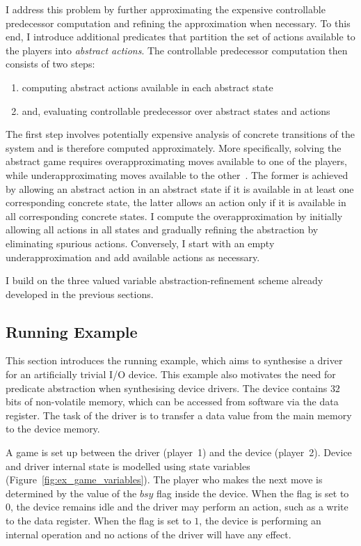 I address this problem by further approximating the expensive controllable predecessor computation and refining the approximation when necessary. To this end, I introduce additional predicates that partition the set of actions available to the players into \emph{abstract actions}. The controllable predecessor computation then consists of two steps: 

\begin{enumerate}
    \item computing abstract actions available in each abstract state
    \item and, evaluating controllable predecessor over abstract states and actions
\end{enumerate}

The first step involves potentially expensive analysis of concrete transitions of the system and is therefore computed approximately. More specifically, solving the abstract game requires overapproximating moves available to one of the players, while underapproximating moves available to the other~\cite{Henzinger_JM_03}.  The former is achieved by allowing an abstract action in an abstract state if it is available in at least one corresponding concrete state, the latter allows an action only if it is available in all corresponding concrete states. I compute the overapproximation by initially allowing all actions in all states and gradually refining the abstraction by eliminating spurious actions.  Conversely, I start with an empty underapproximation and add available actions as necessary.

I build on the three valued variable abstraction-refinement scheme already developed in the previous sections. 

\subsection{Running Example}

This section introduces the running example, which aims to synthesise a driver for an artificially trivial I/O device. This example also motivates the need for predicate abstraction when synthesising device drivers. The device contains $32$ bits of non-volatile memory, which can be accessed from software via the data register. The task of the driver is to transfer a data value from the main memory to the device memory.

A game is set up between the driver (player~1) and the device (player~2).  Device and driver internal state is modelled using state variables (Figure~\ref{fig:ex_game_variables}).  The player who makes the next move is determined by the value of the $bsy$ flag inside the device.  When the flag is set to $0$, the device remains idle and the driver may perform an action, such as a write to the data register.  When the flag is set to $1$, the device is performing an internal operation and no actions of the driver will have any effect. 


